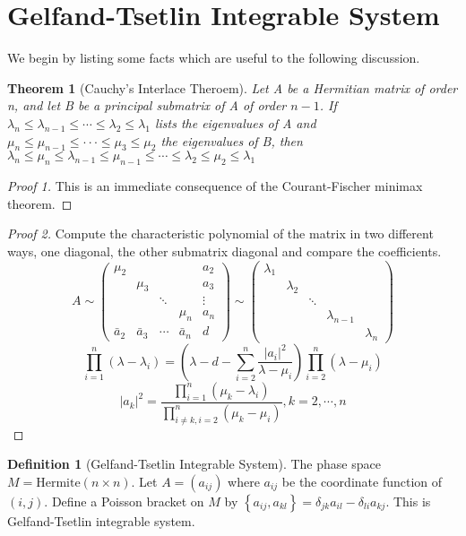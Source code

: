 \documentclass{book}
\newtheorem{theorem}{Theorem}[section]
\theoremstyle{definition}
\newtheorem{definition}{Definition}[section]
\begin{document}
\section{Gelfand-Tsetlin Integrable System}
We begin by listing some facts which are useful to the following discussion.
\begin{theorem}[Cauchy's Interlace Theroem]
Let A be a Hermitian matrix of order n, and let B be a principal submatrix of A of order $n-1$. If $\lambda_n \le \lambda_{n-1} \le\cdots\le \lambda_2 \le \lambda_1$ lists the eigenvalues of A and $\mu_n \le \mu_{n-1} \le···\le \mu_3 \le \mu_2$ the eigenvalues of B, then $\lambda_n \le \mu_n \le \lambda_{n-1} \le \mu_{n-1} \le\cdots\le \lambda_2 \le \mu_2 \le \lambda_1$
\end{theorem}
\begin{proof}[Proof 1]
This is an immediate consequence of the Courant-Fischer minimax theorem.
\end{proof}
\begin{proof}[Proof 2]
Compute the characteristic polynomial of the matrix in two different ways, one diagonal, the other submatrix diagonal and compare the coefficients. 
\[A\sim \begin{pmatrix}\mu_2 &  &  &  & a_2\\ & \mu_3 &  &  & a_3\\ &  &\ddots &  & \vdots\\&  &  & \mu_n &a_n \\\bar{a}_2& \bar{a}_3 & \cdots & \bar{a}_n &d
\end{pmatrix}\sim\begin{pmatrix}\lambda_1 &  &  &  & \\& \lambda_2 &  &  & \\ &  & \ddots &  & \\ &  &  & \lambda_{n-1} & \\&  &  &  &\lambda_n\end{pmatrix}\]
\[\prod_{i=1}^{n} (\lambda-\lambda_i)=(\lambda-d-\sum_{i=2}^{n}\frac{\left | a_i \right |^2}{\lambda-\mu_i})  \prod_{i=2}^{n}(\lambda-\mu_i) \]
\[\left | a_k \right | ^2=\frac{\prod _{i=1}^{n}(\mu_k-\lambda_i)}{\prod _{i\ne k,i=2}^n(\mu_k-\mu_i)}, k=2,\cdots,n\]
\end{proof}
\begin{definition}[Gelfand-Tsetlin Integrable System]
The phase space $M=\text{Hermite}(n\times n)$. Let $A=(a_{ij})$ where $a_{ij}$ be the coordinate function of $(i,j)$. Define a Poisson bracket on $M$ by $\left\{a_{ij},a_{kl}\right\}=\delta_{jk}a_{il}-\delta_{li}a_{kj}$. This is Gelfand-Tsetlin integrable system.
\end{definition}
\end{document}
